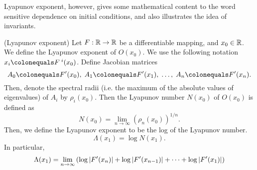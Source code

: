 \documentclass[10pt,twoside,draft]{book}
\begin{document}
Lyapunov exponent, however, gives some mathematical content to the word sensitive dependence on initial conditions, and also illustrates the idea of invariants.
\begin{definition}
  (Lyapunov exponent)
  Let $F: \mathbb{R} \to \mathbb{R}$ be a differentiable mapping, and $x_0 \in \mathbb{R}$.
  We define the Lyapunov exponent of $O(x_0)$.
  We use the following notation $x_i \ceq \itr{F}{i}(x_0)$.
  Define Jacobian matrices
  \begin{equation*}
    A_0 \ceq F'(x_0),
    \; A_1 \ceq F'(x_1),
    \; \ldots,
    \; A_n \ceq F'(x_n).
  \end{equation*}
  Then, denote the spectral radii (i.e. the maximum of the absolute values of eigenvalues) of $A_i$ by $\rho_i(x_0)$.
  Then the Lyapunov number $N(x_0)$ of $O(x_0)$ is defined as 
  \begin{equation*}
    N(x_0) = \lim\limits_{n \to \infty} (\rho_n(x_0))^{1/n}.
  \end{equation*}
  Then, we define the Lyapunov exponent to be the log of the Lyapunov number.
  \begin{equation*}
    \Lambda(x_1) = \log N(x_1).
  \end{equation*}
  In particular,
  \begin{equation*}
    \Lambda(x_1) = \lim\limits_{n \to \infty} \left ( \log\left | F'(x_n) \right | + \log\left | F'(x_{n-1}) \right | + \cdots + \log\left | F'(x_1) \right | \right )
  \end{equation*}
\end{definition}
\end{document}
